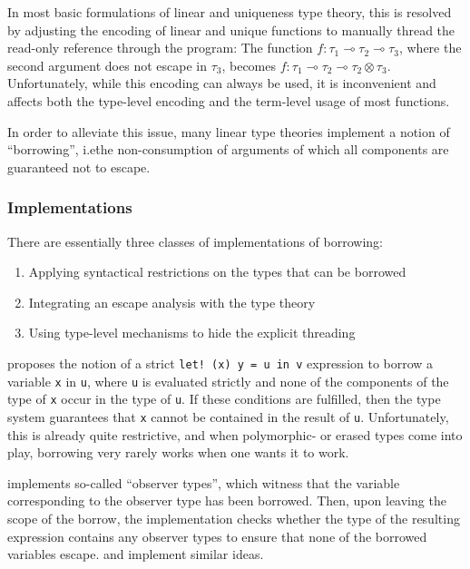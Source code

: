 In most basic formulations of linear and uniqueness type theory, this is resolved by adjusting the encoding of linear and unique functions to manually thread the read-only reference through the program: The function $f : \tau_1 \multimap \tau_2 \multimap \tau_3$, where the second argument does not escape in $\tau_3$, becomes $f : \tau_1 \multimap \tau_2 \multimap \tau_2 \otimes \tau_3$. Unfortunately, while this encoding can always be used, it is inconvenient and affects both the type-level encoding and the term-level usage of most functions. 

In order to alleviate this issue, many linear type theories implement a notion of ``borrowing'', i.e\. the non-consumption of arguments of which all components are guaranteed not to escape. 

\subsubsection{Implementations}
There are essentially three classes of implementations of borrowing:
\begin{enumerate}
	\item Applying syntactical restrictions on the types that can be borrowed \citep{wadler_linear_1990}
	\item Integrating an escape analysis with the type theory \citep{odersky_observers_1992}\citep{kobayashi_quasi-linear_1999}\citep{aspinall_another_2002}
	\item Using type-level mechanisms to hide the explicit threading \citep{spiwack_linearly_2022}
\end{enumerate}

\cite{wadler_linear_1990} proposes the notion of a strict \lstinline|let! (x) y = u in v| expression to borrow a variable \verb|x| in \verb|u|, where \verb|u| is evaluated strictly and none of the components of the type of \verb|x| occur in the type of \verb|u|. If these conditions are fulfilled, then the type system guarantees that \verb|x| cannot be contained in the result of \verb|u|. Unfortunately, this is already quite restrictive, and when polymorphic- or erased types come into play, borrowing very rarely works when one wants it to work.

\cite{odersky_observers_1992} implements so-called ``observer types'', which witness that the variable corresponding to the observer type has been borrowed. Then, upon leaving the scope of the borrow, the implementation checks whether the type of the resulting expression contains any observer types to ensure that none of the borrowed variables escape. \cite{aspinall_another_2002} and \cite{kobayashi_quasi-linear_1999} implement similar ideas.

